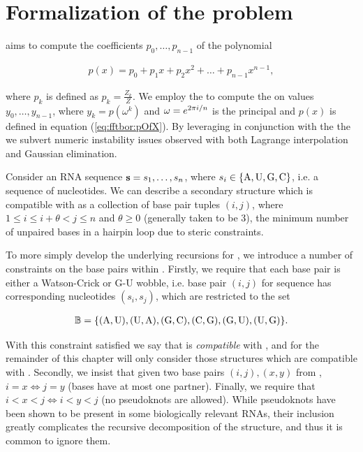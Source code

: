 
\section{Formalization of the problem}
\label{sec:fftbor:formal}

\fftbor aims to compute the coefficients $p_0,\dots,p_{n-1}$ of the polynomial

\begin{align}
\label{eq:fftbor:pOfX}
p(x) = p_0 + p_1 x + p_2 x^2 + \dots + p_{n-1} x^{n-1},
\end{align}

where $p_k$ is defined as $p_k = \frac{Z_k}{Z}$. We employ the \fft to compute
the \idft on values $y_0,\dots,y_{n-1}$, where
$y_k = p(\omega^k)$ and $\omega = e^{2 \pi i/n}$ is the principal \nRoU and $p(x)$ is defined in
equation (\ref{eq:fftbor:pOfX}). By leveraging
\nRoUs in conjunction with the \idft the we subvert numeric instability
issues observed with both Lagrange interpolation and Gaussian elimination.

Consider an RNA sequence ${\bf s} = s_1,\dots,s_n$, where
$s_i \in \{\text{A,\,U,\,G,\,C}\}$, i.e. a sequence of nucleotides. We can describe a
secondary structure \str which is compatible with \seq as a collection of
base pair tuples $(i,j)$, where $1 \le i \le i+\theta < j \le n$ and
$\theta \ge 0$ (generally taken to be 3), the minimum number of unpaired bases
in a hairpin loop due to steric constraints.

To more simply develop the underlying recursions for \fftbor, we introduce a
number of constraints on the base pairs within \str. Firstly, we require that
each base pair is either a Watson-Crick or G-U wobble, i.e. base pair $(i,j)$
for sequence \seq has corresponding nucleotides $(s_i,s_j)$, which are
restricted to the set

\begin{align}
\label{eq:fftbor:validBP}
\bpSet =
\{\text{(A,\,U),\,(U,\,A),\,(G,\,C),\,(C,\,G),\,(G,\,U),\,(U,\,G)}\}.
\end{align}

With
this constraint satisfied we say that \str is {\em compatible} with \seq, and
for the remainder of this chapter will only consider those structures which are
compatible with \seq.
Secondly, we insist that given two base pairs $(i,j), (x,y)$ from \str,
$i=x \iff j=y$ (bases have at most one partner). Finally, we require that
$i<x<j \iff i<y<j$ (no pseudoknots are allowed). While pseudoknots have been
shown to be present in some biologically relevant RNAs, their inclusion greatly
complicates the recursive decomposition of the structure, and thus it is common
to ignore them.

